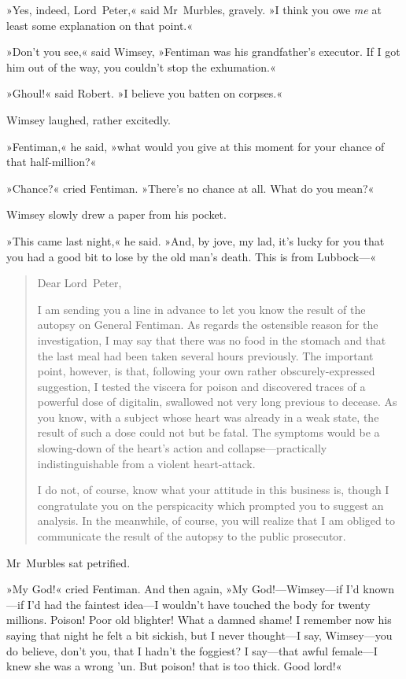 »Yes, indeed, Lord~Peter,« said Mr~Murbles, gravely. »I think you owe \textit{me} at least some explanation on that point.«

»Don't you see,« said Wimsey, »Fentiman was his grandfather's executor. If I got him out of the way, you couldn't stop the exhumation.«

»Ghoul!« said Robert. »I believe you batten on corpses.«

Wimsey laughed, rather excitedly.

»Fentiman,« he said, »what would you give at this moment for your chance of that half-million?«

»Chance?« cried Fentiman. »There's no chance at all. What do you mean?«

Wimsey slowly drew a paper from his pocket.

»This came last night,« he said. »And, by jove, my lad, it's lucky for you that you had a good bit to lose by the old man's death. This is from Lubbock—«

\begin{quotation}
\noindent Dear Lord~Peter,

\indent I am sending you a line in advance to let you know the result of the autopsy on General Fentiman. As regards the ostensible reason for the investigation, I may say that there was no food in the stomach and that the last meal had been taken several hours previously. The important point, however, is that, following your own rather obscurely-expressed suggestion, I tested the viscera for poison and discovered traces of a powerful dose of digitalin, swallowed not very long previous to decease. As you know, with a subject whose heart was already in a weak state, the result of such a dose could not but be fatal. The symptoms would be a slowing-down of the heart's action and collapse—practically indistinguishable from a violent heart-attack.

I do not, of course, know what your attitude in this business is, though I congratulate you on the perspicacity which prompted you to suggest an analysis. In the meanwhile, of course, you will realize that I am obliged to communicate the result of the autopsy to the public prosecutor.
\end{quotation}

Mr~Murbles sat petrified.

»My God!« cried Fentiman. And then again, »My God!—Wimsey—if I'd known—if I'd had the faintest idea—I wouldn't have touched the body for twenty millions. Poison! Poor old blighter! What a damned shame! I remember now his saying that night he felt a bit sickish, but I never thought—I say, Wimsey—you do believe, don't you, that I hadn't the foggiest? I say—that awful female—I knew she was a wrong 'un. But poison! that is too thick. Good lord!«

